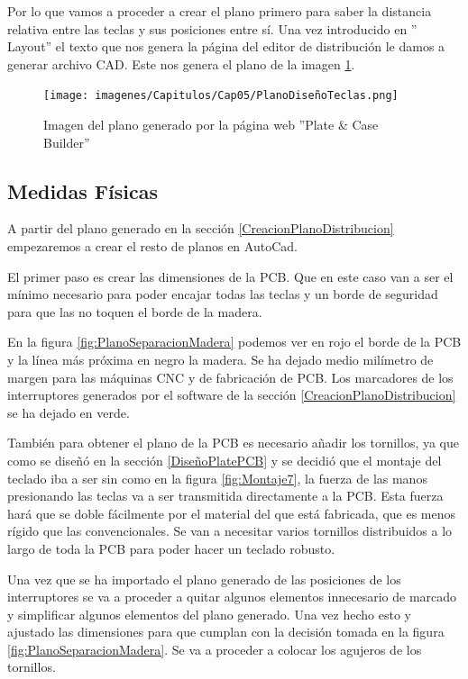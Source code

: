 Por lo que vamos a proceder a crear el plano primero para saber la distancia relativa entre las teclas y sus posiciones entre sí. Una vez introducido en '' Layout'' el texto que nos genera la página del editor de distribución le damos a generar archivo CAD. Este nos genera el plano de la imagen \ref{fig:PlanoDistribucionLayout}.

\begin{figure}[H]
    \centering
    \texttt{[image: imagenes/Capitulos/Cap05/PlanoDiseñoTeclas.png]}
    \caption{Imagen del plano generado por la página web ''Plate \& Case Builder'' \cite{builder-swillkb}}
    \label{fig:PlanoDistribucionLayout}
\end{figure}

\subsection{Medidas Físicas} \label{MedidasFisicas}

A partir del plano generado en la sección \ref{CreacionPlanoDistribucion} empezaremos a crear el resto de planos en AutoCad.

El primer paso es crear las dimensiones de la \gls{PCB}. Que en este caso van a ser el mínimo necesario para poder encajar todas las teclas y un borde de seguridad para que las  no toquen el borde de la madera.

En la figura \ref{fig:PlanoSeparacionMadera} podemos ver en rojo el borde de la \gls{PCB} y la línea más próxima en negro la madera. Se ha dejado medio milímetro de margen para las máquinas CNC y de fabricación de \gls{PCB}. Los marcadores de los interruptores generados por el software de la sección \ref{CreacionPlanoDistribucion} se ha dejado en verde.

También para obtener el plano de la \gls{PCB} es necesario añadir los tornillos, ya que como se diseñó en la sección \ref{DiseñoPlatePCB} y se decidió que el montaje del teclado iba a ser sin  como en la figura \ref{fig:Montaje7}, la fuerza de las manos presionando las teclas va a ser transmitida directamente a la \gls{PCB}. Esta fuerza hará que se doble fácilmente por el material del que está fabricada, que es menos rígido que las  convencionales. Se van a necesitar varios tornillos distribuidos a lo largo de toda la \gls{PCB} para poder hacer un teclado robusto.

Una vez que se ha importado el plano generado de las posiciones de los interruptores se va a proceder a quitar algunos elementos innecesario de marcado y simplificar algunos elementos del plano generado. Una vez hecho esto y ajustado las dimensiones para que cumplan con la decisión tomada en la figura \ref{fig:PlanoSeparacionMadera}. Se va a proceder a colocar los agujeros de los tornillos.

